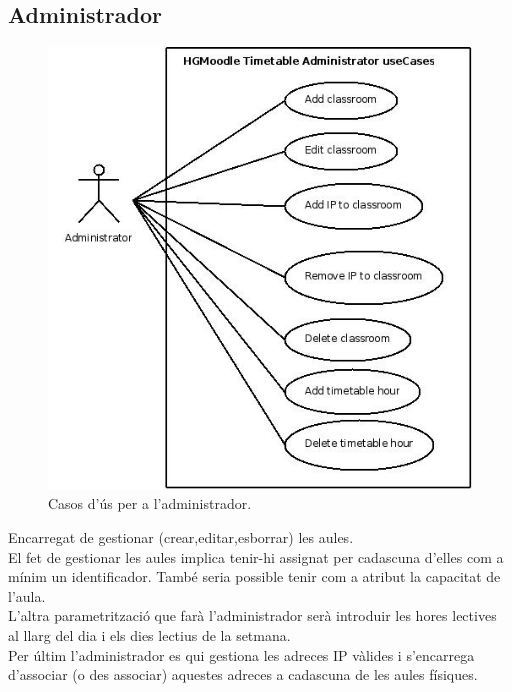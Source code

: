 \documentclass[a4paper]{report}  %
\begin{document}
\subsection{Administrador}
		\begin{figure}[H] %
		\begin{center}
		\includegraphics[width=14cm,keepaspectratio]{img/UseCases-Administrator-rf.jpg}
		\caption[List caption]{Casos d'ús per a l'administrador.}
		\label{fig:UseCases-Administrator-rf}
		\end{center}
		\end{figure}
Encarregat de gestionar (crear,editar,esborrar) les aules.\\  
El fet de gestionar les aules implica tenir-hi assignat per cadascuna d’elles com a mínim un identificador. També seria possible tenir com a atribut la capacitat de l’aula.\\
L'altra parametrització que farà l'administrador serà introduir les hores lectives al llarg del dia i els dies lectius de la setmana.\\
Per últim l'administrador es qui gestiona les adreces IP vàlides i s'encarrega d'associar (o des associar) aquestes adreces a cadascuna de les aules físiques.\\
\end{document}
